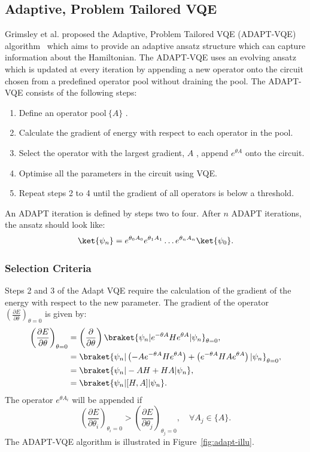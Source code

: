 \subsection{Adaptive, Problem Tailored VQE}
\label{sub:adapt_vqe}
Grimsley et al. proposed the Adaptive, Problem Tailored VQE (ADAPT-VQE) algorithm~\cite{grimsley2019} which aims to provide an adaptive ansatz structure which can capture information about the Hamiltonian.
The ADAPT-VQE uses an evolving ansatz which is updated at every iteration by appending a new operator onto the circuit chosen from a predefined operator pool without draining the pool. The ADAPT-VQE consists of the following steps:
\begin{enumerate}
	\item Define an operator pool$ \ \{ A \}  $ . 
	\item Calculate the gradient of energy with respect to each operator in the pool.
	\item Select the operator with the largest gradient, $ A $ , append $ e^{\theta A} $ onto the circuit.
	\item Optimise all the parameters in the circuit using VQE.
	\item Repeat steps 2 to 4 until the gradient of all operators is below a threshold.
\end{enumerate}
An ADAPT iteration is defined by steps two to four.
After $ n $ ADAPT iterations, the ansatz should look like:
\[ \ket{\psi_{n}} = e^{\theta_0 A_0} e^{\theta_1 A_1} \ldots e^{\theta_n A_n}\ket{\psi_{0}}. \] 
\subsubsection{Selection Criteria}%
\label{ssub:selectioncriteria}
Steps 2 and 3 of the Adapt VQE require the calculation of the gradient of the energy with respect to the new parameter.
The gradient of the operator $ \left(\frac{\partial E}{\partial \theta}\right)_{\theta = 0} $ is given by:
\begin{align}
	\label{eq:A-gradient}
	\left( \frac{\partial E}{\partial \theta} \right)_{\theta = 0} &= \left( \frac{\partial }{\partial \theta} \right) \braket{\psi_n|e^{-\theta A}H e^{\theta A}|\psi_n}_{\theta = 0}, \\
	&= \braket{\psi_n|\left( -A e^{-\theta A} H e^{\theta A}\right)  + \left( e^{-\theta A}HAe^{\theta A} \right)|\psi_n }_{\theta=0}, \\
	&= \braket{\psi_n|-AH + HA|\psi_n}, \\
	&= \braket{\psi_n|[H,A]|\psi_n}.
\end{align}
The operator $ e^{\theta A_i} $ will be appended if 
\begin{equation}
	\label{eq:selection-criteria}
	\left( \frac{\partial E}{\partial \theta_i}\right)_{\theta_i = 0} > \left( \frac{\partial E}{\partial \theta_j} \right)_{\theta_j = 0}, \quad \forall A_j \in \{A\}. 
\end{equation}
The ADAPT-VQE algorithm is illustrated in Figure~\ref{fig:adapt-illu}.

